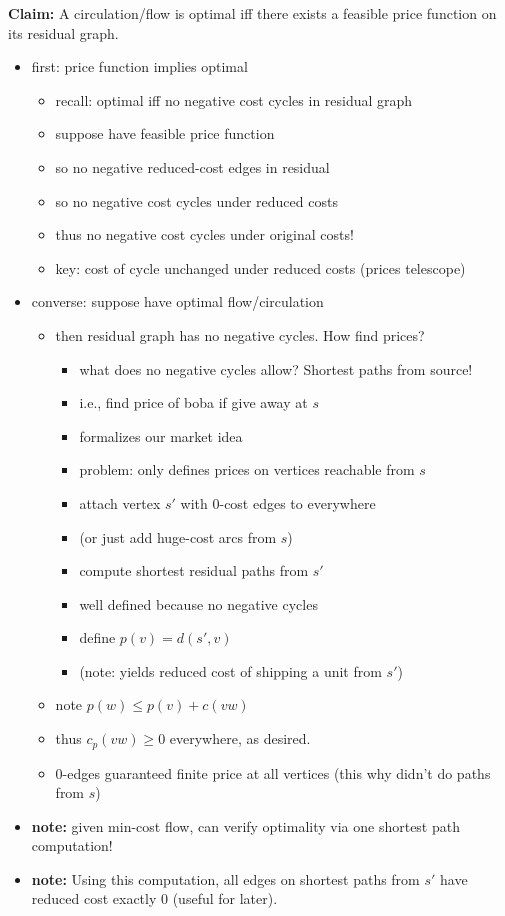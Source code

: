 \documentclass{article}
\begin{document}
{\bf Claim:} A circulation/flow is optimal iff there exists a feasible
price function on its residual graph.
\begin{itemize}
\item first: price function implies optimal
\begin{itemize}
\item recall: optimal iff no negative cost cycles in residual graph
\item suppose have feasible price function
\item so no negative reduced-cost edges in residual 
\item so no negative cost cycles under reduced costs
\item thus no negative cost cycles under original costs!
\item key: cost of cycle unchanged under reduced costs (prices
  telescope)
\end{itemize}
\item converse: suppose have optimal flow/circulation
\begin{itemize}
\item then residual graph has no negative cycles.  How find prices?
\begin{itemize}
\item what does no negative cycles allow?  Shortest paths from source!
\item i.e., find price of boba if give away at $s$
\item formalizes our market idea
\item problem: only defines prices on vertices reachable from $s$
\item attach vertex $s'$ with 0-cost edges to everywhere
  \item (or just add huge-cost arcs from $s$)
\item  compute shortest residual paths from $s'$
\item well defined because no negative cycles
\item define $p(v)=d(s',v)$
\item (note: yields reduced cost of shipping a unit from $s'$)
\end{itemize}
\item note $p(w) \le p(v)+c(vw)$
\item thus $c_p(vw) \ge 0$ everywhere, as desired.
\item 0-edges guaranteed finite price at all vertices (this why didn't
  do paths from $s$)
\end{itemize}
\item {\bf note:} given min-cost flow, can verify optimality via one
  shortest path computation!
\item {\bf note:} Using this computation, all edges on shortest paths
  from $s'$ have reduced cost exactly 0 (useful for later).
\end{itemize}
\end{document}
